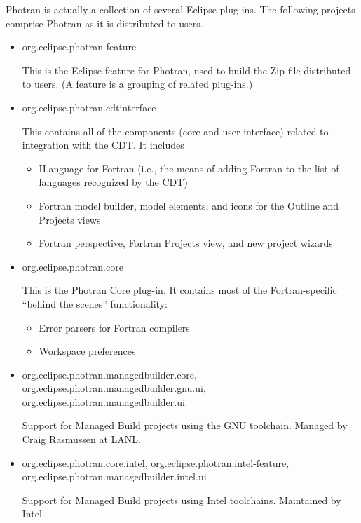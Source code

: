 
Photran is actually a collection of several Eclipse plug-ins.
The following projects comprise Photran as it is distributed to users.

\begin{itemize}

\item org.eclipse.photran-feature

	This is the Eclipse feature for Photran, used to build the Zip
	file distributed to users.  (A feature is a grouping of related
	plug-ins.)

\item org.eclipse.photran.cdtinterface

	This contains all of the components (core and user interface) related
	to integration with the CDT.  It includes
	\begin{itemize}
	\item ILanguage for Fortran (i.e., the means
              of adding Fortran to the list of languages recognized
              by the CDT)
	\item Fortran model builder, model elements, and icons for the Outline and Projects views
	\item Fortran perspective, Fortran Projects view, and new project wizards
	\end{itemize}

\item org.eclipse.photran.core

	This is the Photran Core plug-in.  It
	contains most of the Fortran-specific ``behind the scenes'' functionality:
	\begin{itemize}
	\item Error parsers for Fortran compilers
	\item Workspace preferences
	\end{itemize}

\item org.eclipse.photran.managedbuilder.core,
      org.eclipse.photran.managedbuilder.gnu.ui,
      org.eclipse.photran.managedbuilder.ui

	Support for Managed Build projects using the GNU toolchain.
	Managed by Craig Rasmussen at LANL.

\item org.eclipse.photran.core.intel,
      org.eclipse.photran.intel-feature,
      org.eclipse.photran.managedbuilder.intel.ui

	Support for Managed Build projects using Intel toolchains.
	Maintained by Intel.


\end{itemize}
